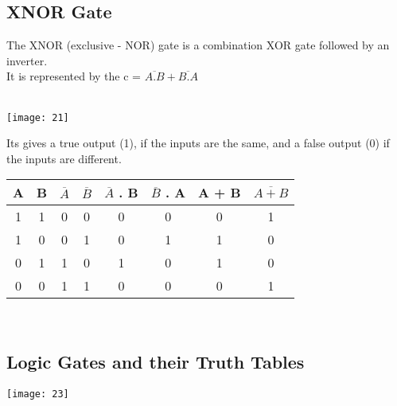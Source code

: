 \documentclass{article}
\begin{document}
\subsection{XNOR Gate}
The XNOR (exclusive - NOR) gate is a combination XOR gate followed by an inverter. \\
 It is represented by the \color{red} c = $\overline{A.B} + \overline{B.A}$  \\ \color{black} \\
\begin{center}
	\texttt{[image: 21]}
\end{center}
Its gives a  true output (1), if the inputs are the same, and a false output (0) if the inputs are different. \\
\begin{table}[h!]
	\begin{center}
		\begin{tabular}{c|c|c|c|c|c|c|c}
			\textbf{A} & \textbf{B} & \textbf{$\overline{A}$} & \textbf{$\overline{B}$} & \textbf{$\overline{A}$ . B} & \textbf{$\overline{B}$ . A} & \textbf{A} + \textbf{B} & \textbf{$\overline{A + B}$}\\
			\hline
			1 & 1 & 0 & 0 & 0 & 0 & 0 & 1\\
			\hline
			1 & 0 & 0 & 1 & 0 & 1 & 1 & 0\\
			\hline
			0 & 1 & 1 & 0 & 1 & 0 & 1 & 0\\
			\hline
			0 & 0 & 1 & 1 & 0 & 0 & 0 & 1\\
			\hline
		\end{tabular}
	\end{center}
\end{table} \\

\subsection{Logic Gates and their Truth Tables}
\texttt{[image: 23]}
\end{document}
